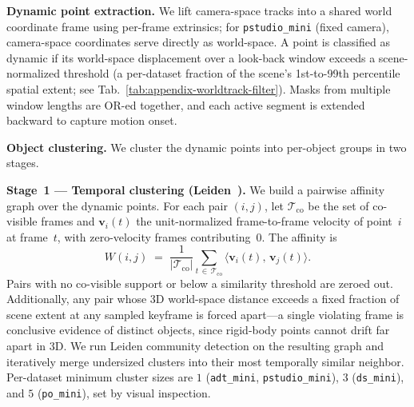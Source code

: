 \begin{table}[h]
  \centering
  \small
  \setlength{\tabcolsep}{4pt}
  \vspace{2mm}
  \caption{Per-dataset motion-filter settings for dynamic point extraction of WorldTrack data.}
  \label{tab:appendix-worldtrack-filter}
\end{table}

\noindent\textbf{Dynamic point extraction.}
We lift camera-space tracks into a shared world coordinate frame using
per-frame extrinsics; for \texttt{pstudio\_mini} (fixed camera), camera-space
coordinates serve directly as world-space. A point is classified as dynamic if
its world-space displacement over a look-back window exceeds a
scene-normalized threshold (a per-dataset fraction of the scene's
1st-to-99th percentile spatial extent; see
Tab.~\ref{tab:appendix-worldtrack-filter}). Masks from multiple window
lengths are OR-ed together, and each active segment is extended backward to
capture motion onset.

\noindent\textbf{Object clustering.}
We cluster the dynamic points into per-object groups in two stages.

\noindent\textbf{Stage~1 --- Temporal clustering (Leiden~\cite{traag2019leiden}).}
We build a pairwise affinity graph over the dynamic points. For each pair
$(i,j)$, let $\mathcal{T}_\text{co}$ be the set of co-visible frames and
$\mathbf{v}_i(t)$ the unit-normalized frame-to-frame velocity of point~$i$
at frame~$t$, with zero-velocity frames contributing~$0$. The affinity is
\[
  W(i,j) \;=\; \frac{1}{|\mathcal{T}_\text{co}|}
    \sum_{t\,\in\,\mathcal{T}_\text{co}}
    \langle\mathbf{v}_i(t),\,\mathbf{v}_j(t)\rangle.
\]
Pairs with no co-visible support or below a similarity threshold are zeroed
out. Additionally, any pair whose 3D world-space distance exceeds a fixed
fraction of scene extent at any sampled keyframe is forced apart---a single
violating frame is conclusive evidence of distinct objects, since rigid-body
points cannot drift far apart in 3D. We run Leiden community detection on the
resulting graph and iteratively merge undersized clusters into their most
temporally similar neighbor. Per-dataset minimum cluster sizes are $1$
(\texttt{adt\_mini}, \texttt{pstudio\_mini}), $3$ (\texttt{ds\_mini}), and
$5$ (\texttt{po\_mini}), set by visual inspection.

